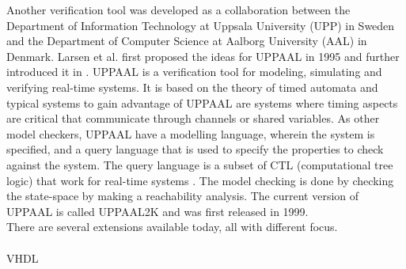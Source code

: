 \documentclass[a4paper]{report}
\begin{document}
Another verification tool was developed as a collaboration between the Department of Information Technology at Uppsala University (UPP) in Sweden and the Department of Computer Science at Aalborg University (AAL) in Denmark. Larsen et al. first proposed the ideas for UPPAAL\cite{Larsen1995} in 1995 and further introduced it in \cite{Bengtsson1995}. 
UPPAAL\cite{uppaal} is a verification tool for modeling, simulating and verifying real-time systems.
It is based on the theory of timed automata\cite{Hopcroft2001}\cite{Alur1990} and typical systems to gain advantage of UPPAAL are systems where timing aspects are critical that communicate through channels or shared variables.
As other model checkers, UPPAAL have a modelling language, wherein the system is specified, and a query language that is used to specify the properties to check against the system. The query language is a subset of CTL (computational tree logic) that work for real-time systems\cite{Henzinger1994} \cite{Larsen1995}. The model checking is done by checking the state-space by making a reachability analysis. The current version of UPPAAL is called UPPAAL2K and was first released in 1999\cite{Amnell2001}.
\\
There are several extensions available today, all with different focus. \\\\
VHDL
\end{document}
